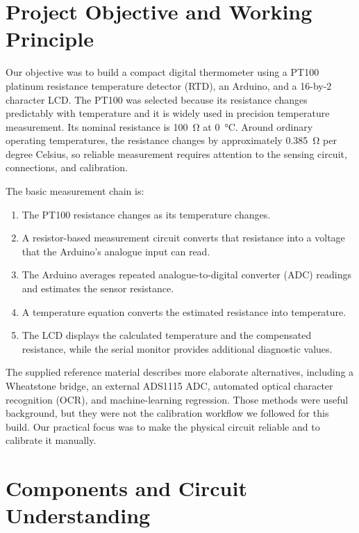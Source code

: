 \documentclass[12pt,a4paper]{article}
\begin{document}
\clearpage
{}

\section{Project Objective and Working Principle}

Our objective was to build a compact digital thermometer using a PT100
platinum resistance temperature detector (RTD), an Arduino, and a
16-by-2 character LCD. The PT100 was selected because its resistance
changes predictably with temperature and it is widely used in precision
temperature measurement. Its nominal resistance is \SI{100}{\ohm} at
\SI{0}{\degreeCelsius}. Around ordinary operating temperatures, the
resistance changes by approximately \SI{0.385}{\ohm} per degree Celsius,
so reliable measurement requires attention to the sensing circuit,
connections, and calibration.

The basic measurement chain is:

\begin{enumerate}[leftmargin=2em]
    \item The PT100 resistance changes as its temperature changes.
    \item A resistor-based measurement circuit converts that resistance
    into a voltage that the Arduino's analogue input can read.
    \item The Arduino averages repeated analogue-to-digital converter
    (ADC) readings and estimates the sensor resistance.
    \item A temperature equation converts the estimated resistance into
    temperature.
    \item The LCD displays the calculated temperature and the compensated
    resistance, while the serial monitor provides additional diagnostic
    values.
\end{enumerate}

The supplied reference material describes more elaborate alternatives,
including a Wheatstone bridge, an external ADS1115 ADC, automated
optical character recognition (OCR), and machine-learning regression.
Those methods were useful background, but they were not the calibration
workflow we followed for this build. Our practical focus was to make the
physical circuit reliable and to calibrate it manually.

\section{Components and Circuit Understanding}
\end{document}
